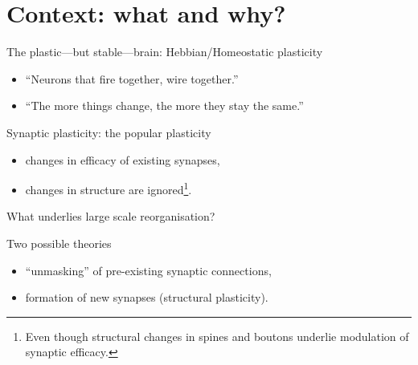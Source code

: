 \begin{frame}
  \titlepage{}
\end{frame}

\section{Context: what and why?}
\begin{frame}[c]{The plastic---but stable---brain: Hebbian/Homeostatic plasticity}
  \pause{}
  \begin{itemize}
    \item \enquote{Neurons that fire together, wire together.}\footnotemark[1]{}
      \pause{}
    \item \enquote{The more things change, the more they stay the same.}\footnotemark[2]{}
  \end{itemize}
\end{frame}
\begin{frame}[c]{Synaptic plasticity: the popular plasticity}
  \begin{itemize}
    \item changes in efficacy of \alert{existing} synapses,
      \pause{}
    \item changes in structure are ignored\footnote[1]{Even though structural changes in spines and boutons underlie modulation of synaptic efficacy.}.
  \end{itemize}
\end{frame}
\begin{frame}[c]{What underlies large scale reorganisation?}
  \begin{itemize}
    \item {}
  \pause{}
  \scriptsize{
      \item {}
      \item {}
      \item {}
      \item {}
      \item {}
      }
  \end{itemize}
\end{frame}
\begin{frame}[c]{Two possible theories}
  \begin{itemize}
    \item \enquote{unmasking} of pre-existing synaptic connections,
      \pause{}
    \item formation of new synapses (\alert{structural plasticity}).
  \end{itemize}
\end{frame}
